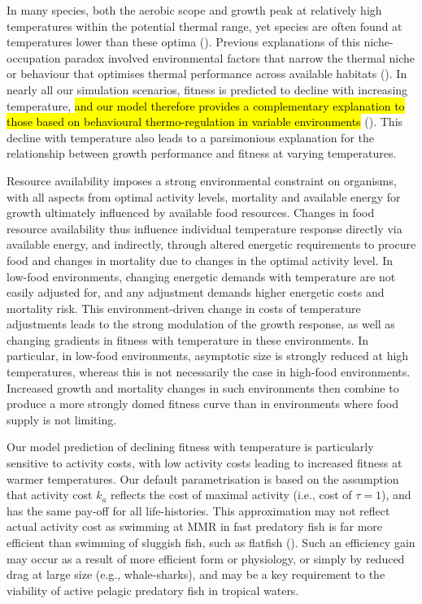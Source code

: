 \documentclass[11pt]{article}\usepackage[]{graphicx}\usepackage[]{color,soul}
\begin{document}
In many species, both the aerobic scope and growth peak at relatively high temperatures within the potential thermal range, yet species are often found at temperatures lower than these optima (\citealt{magnuson_thermal_1997, claireaux_influence_2000}). Previous explanations of this niche-occupation paradox involved environmental factors that narrow the thermal niche or behaviour that optimises thermal performance across available habitats (\citealt{claireaux_influence_2000, magnuson_thermal_1997, martin_why_2008}). In nearly all our simulation scenarios, fitness is predicted to decline with increasing temperature, \hl{and our model therefore provides a complementary explanation to those based on behavioural thermo-regulation in variable environments} (\cite[e.g., ][]{martin_why_2008}). This decline with temperature also leads to a parsimonious explanation for the relationship between growth performance and fitness at varying temperatures.

Resource availability imposes a strong environmental constraint on organisms, with all aspects from optimal activity levels, mortality and available energy for growth ultimately influenced by available food resources. Changes in food resource availability thus influence individual temperature response directly via available energy, and indirectly, through altered energetic requirements to procure food and changes in mortality due to changes in the optimal activity level. In low-food environments, changing energetic demands with temperature are not easily adjusted for, and any adjustment demands higher energetic costs and mortality risk. This environment-driven change in costs of temperature adjustments leads to the strong modulation of the growth response, as well as changing gradients in fitness with temperature in these environments. In particular, in low-food environments, asymptotic size is strongly reduced at high temperatures, whereas this is not necessarily the case in high-food environments. Increased growth and mortality changes in such environments then combine to produce a more strongly domed fitness curve than in environments where food supply is not limiting.

Our model prediction of declining fitness with temperature is
particularly sensitive to activity costs, with low activity costs
leading to increased fitness at warmer temperatures. Our
default parametrisation is based on the assumption that activity cost $k_a$ reflects the cost of maximal activity (i.e., cost of
$\tau=1$), and has the same pay-off for all life-histories. This approximation may not
reflect actual activity cost as swimming at MMR in fast predatory fish
is far more efficient than swimming of sluggish fish, such as flatfish
(\citealt{priede_metabolic_1985}). Such an efficiency gain may occur as a result of more efficient form or physiology, or simply by reduced drag at large size (e.g., whale-sharks), and may be a key requirement to the viability of active pelagic predatory fish in tropical waters.
\end{document}
